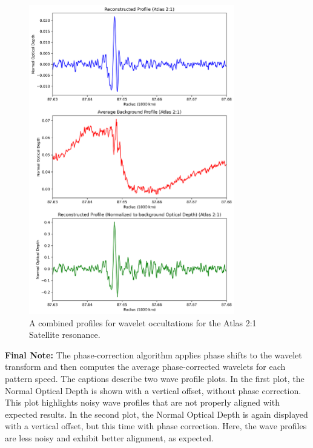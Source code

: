 \documentclass{article}
\begin{document}
\begin{figure}
\centering 
\includegraphics[width=0.8\textwidth]{combinedprofiles_atlas21.png}
\caption{A combined profiles for wavelet occultations for the Atlas 2:1 Satellite resonance.} \label{fig:my_label}
\end{figure}



\textbf{Final Note:}
The phase-correction algorithm applies phase shifts to the wavelet transform and then computes the average phase-corrected wavelets for each pattern speed. The captions describe two wave profile plots. In the first plot, the Normal Optical Depth is shown with a vertical offset, without phase correction. This plot highlights noisy wave profiles that are not properly aligned with expected results. In the second plot, the Normal Optical Depth is again displayed with a vertical offset, but this time with phase correction. Here, the wave profiles are less noisy and exhibit better alignment, as expected.

\end{document}
